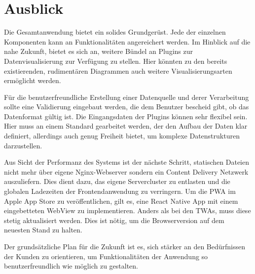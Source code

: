 \chapter{Ausblick}
\label{chap:ausblick}

Die Gesamtanwendung bietet ein solides Grundgerüst. Jede der einzelnen Komponenten
kann an Funktionalitäten angereichert werden. Im Hinblick auf die nahe Zukunft, bietet es sich an,
weitere Bündel an Plugins zur Datenvisualisierung zur Verfügung zu stellen. Hier könnten
zu den bereits existierenden, rudimentären Diagrammen auch weitere Visualisierungsarten ermöglicht
werden.

Für die benutzerfreundliche Erstellung einer Datenquelle und derer Verarbeitung
sollte eine Validierung eingebaut werden, die dem Benutzer bescheid gibt, ob das Datenformat
gültig ist. Die Eingangsdaten der Plugins können sehr flexibel sein. Hier muss an einem Standard
gearbeitet werden, der den Aufbau der Daten klar definiert, allerdings auch genug Freiheit bietet,
um komplexe Datenstrukturen darzustellen.

Aus Sicht der Performanz des Systems ist der nächste
Schritt, statischen Dateien nicht mehr über eigene Nginx-Webserver sondern ein
Content Delivery Netzwerk auszuliefern. Dies dient dazu, das eigene Servercluster
zu entlasten und die globalen Ladezeiten der Frontendanwendung zu verringern.
Um die PWA im Apple App Store zu veröffentlichen, gilt es, eine React Native
App mit einem eingebetteten WebView zu implementieren. Anders als bei den TWAs, muss
diese stetig aktualisiert werden. Dies ist nötig, um die Browserversion auf
dem neuesten Stand zu halten.

Der grundsätzliche Plan für die Zukunft ist es, sich stärker an den
Bedürfnissen der Kunden zu orientieren, um Funktionalitäten der Anwendung
so benutzerfreundlich wie möglich zu gestalten.
